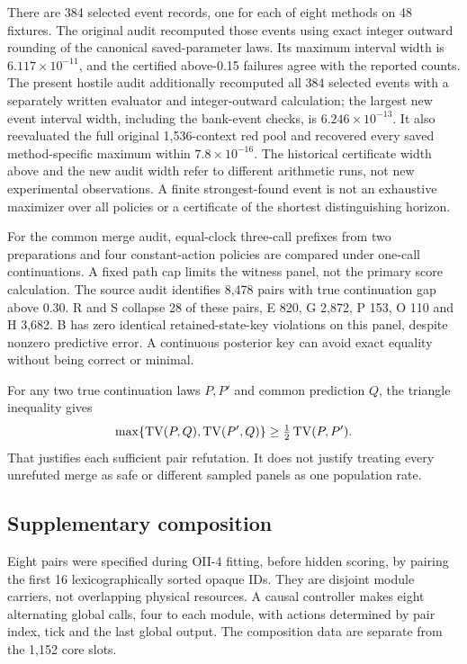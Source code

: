 There are 384 selected event records, one for each of eight methods on 48 fixtures. The original audit recomputed those events using exact integer outward rounding of the canonical saved-parameter laws. Its maximum interval width is $6.117\times10^{-11}$, and the certified above-0.15 failures agree with the reported counts. The present hostile audit additionally recomputed all 384 selected events with a separately written evaluator and integer-outward calculation; the largest new event interval width, including the bank-event checks, is $6.246\times10^{-13}$. It also reevaluated the full original 1,536-context red pool and recovered every saved method-specific maximum within $7.8\times10^{-16}$. The historical certificate width above and the new audit width refer to different arithmetic runs, not new experimental observations. A finite strongest-found event is not an exhaustive maximizer over all policies or a certificate of the shortest distinguishing horizon.

For the common merge audit, equal-clock three-call prefixes from two preparations and four constant-action policies are compared under one-call continuations. A fixed path cap limits the witness panel, not the primary score calculation. The source audit identifies 8,478 pairs with true continuation gap above 0.30. R and S collapse 28 of these pairs, E 820, G 2,872, P 153, O 110 and H 3,682. B has zero identical retained-state-key violations on this panel, despite nonzero predictive error. A continuous posterior key can avoid exact equality without being correct or minimal.

For any two true continuation laws $P,P'$ and common prediction $Q$, the triangle inequality gives
\begin{equation}
 \max\{\operatorname{TV}(P,Q),\operatorname{TV}(P',Q)\}\geq\tfrac12\operatorname{TV}(P,P').
 \label{eq:merge-witness}
\end{equation}
That justifies each sufficient pair refutation. It does not justify treating every unrefuted merge as safe or different sampled panels as one population rate.

\subsection{Supplementary composition}\label{p3:c16}
Eight pairs were specified during OII-4 fitting, before hidden scoring, by pairing the first 16 lexicographically sorted opaque IDs. They are disjoint module carriers, not overlapping physical resources. A causal controller makes eight alternating global calls, four to each module, with actions determined by pair index, tick and the last global output. The composition data are separate from the 1,152 core slots.

